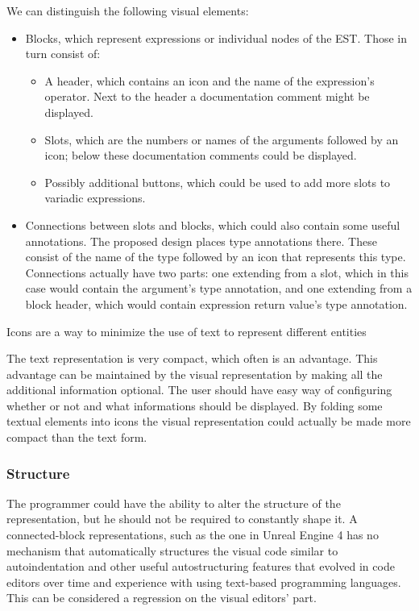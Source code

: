 We can distinguish the following visual elements:
\begin{itemize}
	\item Blocks, which represent expressions or individual nodes of the EST. Those in turn consist of:
	\begin{itemize}
		\item A header, which contains an icon and the name of the expression's operator. Next to the header a documentation comment might be displayed.
		\item Slots, which are the numbers or names of the arguments followed by an icon; below these documentation comments could be displayed.
		\item Possibly additional buttons, which could be used to add more slots to variadic expressions.
	\end{itemize}
	\item Connections between slots and blocks, which could also contain some useful annotations. The proposed design places type annotations there. These consist of the name of the type followed by an icon that represents this type. Connections actually have two parts: one extending from a slot, which in this case would contain the argument's type annotation, and one extending from a block header, which would contain expression return value's type annotation.
\end{itemize}

Icons are a way to minimize the use of text to represent different entities

The text representation is very compact, which often is an advantage. This advantage can be maintained by the visual representation by making all the additional information optional. The user should have easy way of configuring whether or not and what informations should be displayed. By folding some textual elements into icons the visual representation could actually be made more compact than the text form.

\subsubsection{Structure}
The programmer could have the ability to alter the structure of the representation, but he should not be required to constantly shape it. A connected-block representations, such as the one in Unreal Engine 4 has no mechanism that automatically structures the visual code similar to autoindentation and other useful autostructuring features that evolved in code editors over time and experience with using text-based programming languages. This can be considered a regression on the visual editors' part. 

